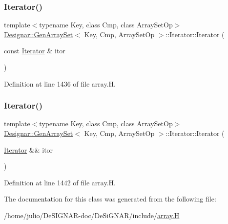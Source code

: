 \mbox{\label{class_designar_1_1_gen_array_set_1_1_iterator_a080025e4989fd5c3110e93e0c7c17fe2}} 
\subsubsection{\texorpdfstring{Iterator()}{Iterator()}\hspace{0.1cm}{\footnotesize\ttfamily [4/5]}}
{\footnotesize\ttfamily template$<$typename Key, class Cmp, class Array\+Set\+Op$>$ \\
\hyperlink{class_designar_1_1_gen_array_set}{Designar\+::\+Gen\+Array\+Set}$<$ Key, Cmp, Array\+Set\+Op $>$\+::Iterator\+::\+Iterator (\begin{DoxyParamCaption}\item[{const \hyperlink{class_designar_1_1_gen_array_set_1_1_iterator}{Iterator} \&}]{itor }\end{DoxyParamCaption})\hspace{0.3cm}{\ttfamily [inline]}}



Definition at line 1436 of file array.\+H.

\mbox{\label{class_designar_1_1_gen_array_set_1_1_iterator_aa82e1690f18b28782163e6bbb9d7d32a}} 
\subsubsection{\texorpdfstring{Iterator()}{Iterator()}\hspace{0.1cm}{\footnotesize\ttfamily [5/5]}}
{\footnotesize\ttfamily template$<$typename Key, class Cmp, class Array\+Set\+Op$>$ \\
\hyperlink{class_designar_1_1_gen_array_set}{Designar\+::\+Gen\+Array\+Set}$<$ Key, Cmp, Array\+Set\+Op $>$\+::Iterator\+::\+Iterator (\begin{DoxyParamCaption}\item[{\hyperlink{class_designar_1_1_gen_array_set_1_1_iterator}{Iterator} \&\&}]{itor }\end{DoxyParamCaption})\hspace{0.3cm}{\ttfamily [inline]}}



Definition at line 1442 of file array.\+H.



The documentation for this class was generated from the following file\+:\begin{DoxyCompactItemize}
\item 
/home/julio/\+De\+S\+I\+G\+N\+A\+R-\/doc/\+De\+Si\+G\+N\+A\+R/include/\hyperlink{array_8_h}{array.\+H}\end{DoxyCompactItemize}
